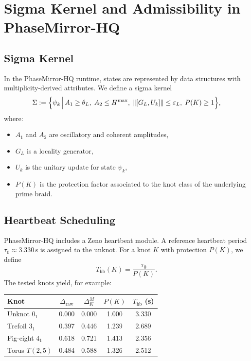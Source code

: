 \documentclass[11pt]{article}
\theoremstyle{remark}
\begin{document}
\section{Sigma Kernel and Admissibility in PhaseMirror-HQ}

\subsection{Sigma Kernel}

In the PhaseMirror-HQ runtime, states are represented by data structures with
multiplicity-derived attributes. We define a sigma kernel
\[
  \Sigma := \Bigl\{\psi_k \,\Big|\,
  A_1 \ge \theta_L,\;
  A_2 \le H^{\max},\;
  \|[G_L,U_k]\| \le \varepsilon_L,\;
  P(K)\ge 1\Bigr\},
\]
where:
\begin{itemize}[nosep]
  \item $A_1$ and $A_2$ are oscillatory and coherent amplitudes,
  \item $G_L$ is a locality generator,
  \item $U_k$ is the unitary update for state $\psi_k$,
  \item $P(K)$ is the protection factor associated to the knot class of the
        underlying prime braid.
\end{itemize}

\subsection{Heartbeat Scheduling}

PhaseMirror-HQ includes a Zeno heartbeat module. A reference heartbeat period
$\tau_0 \approx 3.330\,$s is assigned to the unknot. For a knot $K$ with protection
$P(K)$, we define
\[
  T_{\text{hb}}(K) = \frac{\tau_0}{P(K)}.
\]
The tested knots yield, for example:
\begin{center}
\begin{tabular}{lcccc}
\toprule
Knot & $\Delta_{\text{raw}}$ & $\Delta_K^M$ & $P(K)$ & $T_{\text{hb}}$ (s)\\
\midrule
Unknot $0_1$   & 0.000 & 0.000 & 1.000 & 3.330 \\
Trefoil $3_1$  & 0.397 & 0.446 & 1.239 & 2.689 \\
Fig-eight $4_1$& 0.618 & 0.721 & 1.413 & 2.356 \\
Torus $T(2,5)$ & 0.484 & 0.588 & 1.326 & 2.512 \\
\bottomrule
\end{tabular}
\end{center}
\end{document}
